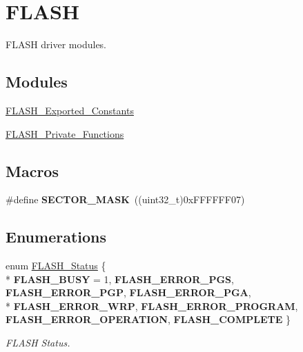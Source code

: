 \hypertarget{group___f_l_a_s_h}{\section{F\-L\-A\-S\-H}
\label{group___f_l_a_s_h}
}


F\-L\-A\-S\-H driver modules.  


\subsection*{Modules}
\begin{DoxyCompactItemize}
\item 
\hyperlink{group___f_l_a_s_h___exported___constants}{F\-L\-A\-S\-H\-\_\-\-Exported\-\_\-\-Constants}
\item 
\hyperlink{group___f_l_a_s_h___private___functions}{F\-L\-A\-S\-H\-\_\-\-Private\-\_\-\-Functions}
\end{DoxyCompactItemize}
\subsection*{Macros}
\begin{DoxyCompactItemize}
\item 
\hypertarget{group___f_l_a_s_h_gaa2c907f663ac6d7fb5c311d08589b4f5}{\#define {\bfseries S\-E\-C\-T\-O\-R\-\_\-\-M\-A\-S\-K}~((uint32\-\_\-t)0x\-F\-F\-F\-F\-F\-F07)}\label{group___f_l_a_s_h_gaa2c907f663ac6d7fb5c311d08589b4f5}

\end{DoxyCompactItemize}
\subsection*{Enumerations}
\begin{DoxyCompactItemize}
\item 
enum \hyperlink{group___f_l_a_s_h_gadc63a6f3404ff1f71229a66915e9cdc0}{F\-L\-A\-S\-H\-\_\-\-Status} \{ \\*
{\bfseries F\-L\-A\-S\-H\-\_\-\-B\-U\-S\-Y} = 1, 
{\bfseries F\-L\-A\-S\-H\-\_\-\-E\-R\-R\-O\-R\-\_\-\-P\-G\-S}, 
{\bfseries F\-L\-A\-S\-H\-\_\-\-E\-R\-R\-O\-R\-\_\-\-P\-G\-P}, 
{\bfseries F\-L\-A\-S\-H\-\_\-\-E\-R\-R\-O\-R\-\_\-\-P\-G\-A}, 
\\*
{\bfseries F\-L\-A\-S\-H\-\_\-\-E\-R\-R\-O\-R\-\_\-\-W\-R\-P}, 
{\bfseries F\-L\-A\-S\-H\-\_\-\-E\-R\-R\-O\-R\-\_\-\-P\-R\-O\-G\-R\-A\-M}, 
{\bfseries F\-L\-A\-S\-H\-\_\-\-E\-R\-R\-O\-R\-\_\-\-O\-P\-E\-R\-A\-T\-I\-O\-N}, 
{\bfseries F\-L\-A\-S\-H\-\_\-\-C\-O\-M\-P\-L\-E\-T\-E}
 \}
\begin{DoxyCompactList}\small\item\em F\-L\-A\-S\-H Status. \end{DoxyCompactList}\end{DoxyCompactItemize}

